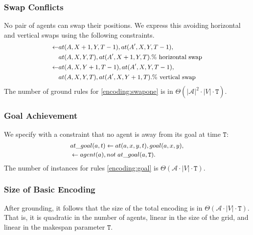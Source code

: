 \subsubsection{Swap Conflicts}
No pair of agents can swap their positions. We express this avoiding horizontal and vertical swaps using the following constraints.
\begin{equation}\small\label{encoding:swapone}
  \begin{split}
        \leftarrow &at(A,X+1,Y,T-1), at(A',X,Y,T-1),\\
        &at(A,X,Y,T), at(A',X+1,Y,T). \text{\% horizontal swap} \\
        \leftarrow &at(A,X,Y+1,T-1), at(A',X,Y,T-1),\\
        &at(A,X,Y,T), at(A',X,Y+1,T). \text{\% vertical swap}
  \end{split}
\end{equation}
The number of ground rules for \eqref{encoding:swapone} is in $\Theta(|\mathcal{A}|^2 \cdot |V| \cdot \mathtt{T})$.

\subsubsection{Goal Achievement}
We specify with a constraint that no agent is away from its goal at time $\mathtt{T}$:
\begin{equation}\small\label{encoding:goal}
  \begin{split}
&at\_goal(a,t) \leftarrow at(a,x,y,t), goal(a,x,y),\\
&\leftarrow agent(a), not \; at\_goal(a,\mathtt{T}).
\end{split}
\end{equation}
The number of instances for rules \eqref{encoding:goal} is $\Theta(\mathcal{A} \cdot |V| \cdot \mathtt{T})$.
\subsubsection{Size of Basic Encoding}
After grounding, it follows that the size of the total encoding is in $\Theta(\mathcal{A} \cdot |V| \cdot \mathtt{T})$. That is, it is quadratic in the number of agents, linear in the size of the grid, and linear in the makespan parameter $\mathtt{T}$.
